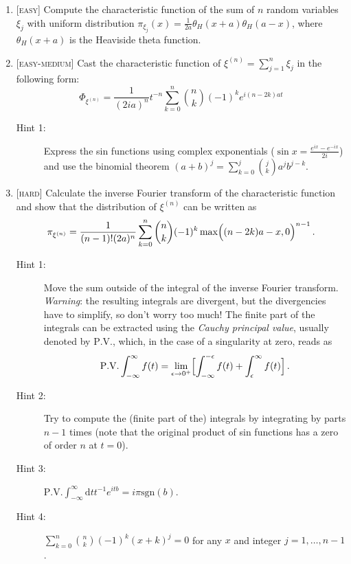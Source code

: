 \documentclass{article}
\newcommand{\be}{\begin{equation}}
\newcommand{\ee}{\end{equation}}
\newcommand{\1}{{\rm I}}
\begin{document}
\begin{enumerate}
\begin{description}
\end{description}
\begin{enumerate}
\item  \textsc{[easy]}  Compute the characteristic function of the sum of $n$ random variables $\xi_j$ with uniform distribution $\pi_{\xi_j}(x)=\frac{1}{2a}\theta_H(x+a)\theta_H(a-x)$, where $\theta_H(x+a)$ is the Heaviside theta function.
\item \textsc{[easy-medium]} Cast the characteristic function of  $\xi^{(n)}=\sum_{j=1}^n\xi_j$ in the following form:
\be
\Phi_{\xi^{(n)}}=\frac{1}{(2i a)^n}t^{-n}\sum_{k=0}^n\binom{n}{k}(-1)^ke^{i (n-2k) a t} 
\ee
\begin{description}
\item[Hint 1:] Express the sin functions using complex exponentials ($\sin x=\frac{e^{ix}-e^{-i x}}{2 i}$) and use the binomial theorem $(a+b)^j=\sum_{k=0}^j\binom{j}{k}a^j b^{j-k}$.
\end{description}
\item  \textsc{[hard]} Calculate the inverse Fourier transform of the characteristic function and show that the distribution of $\xi^{(n)}$ can be written as~\cite{BG:2002,Feller}
\be\label{eq:probsum}
\pi_{\xi^{(n)}}=\frac{1}{(n-1)! (2a)^n}\sum_{k=0}^n \binom{n}{k}(-1)^k\max\Bigl((n-2k)a-x,0\Bigr)^{n-1}\, .
\ee
\begin{description}
\item[Hint 1:]  Move the sum outside of the integral of the inverse Fourier transform. \emph{Warning}: the resulting integrals are divergent, but the divergencies have to simplify, so don't worry too much! The finite part of the integrals can be extracted using the \emph{Cauchy principal value}, usually denoted by $\textrm{P.V.}$, which, in the case of a singularity at zero, reads as
\be
\mathrm{P.V.}\int_{-\infty}^\infty f(t)=\lim_{\epsilon\rightarrow 0^+}\Bigl[\int_{-\infty}^{-\epsilon}f(t)+\int^{\infty}_{\epsilon}f(t)\Bigr]\, .
\ee 
\item[Hint 2:] Try to compute the (finite part of the) integrals by integrating by parts $n-1$ times (note that the original product of sin functions has a zero of order $n$ at $t=0$). 
\item[Hint 3:] $\mathrm{P.V.}\int_{-\infty}^\infty\mathrm d t t^{-1} e^{i t b}=i \pi \mathrm{sgn}(b)$.
\item[Hint 4:] $\sum_{k=0}^n \binom{n}{k}(-1)^k (x+k)^{j}=0$ for any $x$ and integer $j=1,\dots,n-1$.


\end{description}
\end{enumerate}
\end{enumerate}
\end{document}
